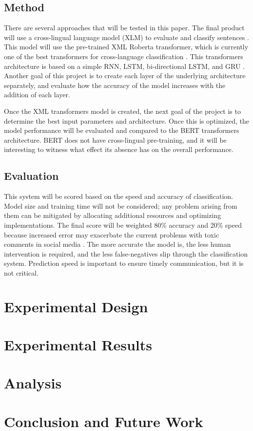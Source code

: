 \documentclass{article}
\begin{document}
\subsection{Method}

There are several approaches that will be tested in this paper. The final product will use a cross-lingual language model (XLM) to evaluate and classify sentences \cite{lample2019crosslingual}. This model will use the pre-trained XML Roberta transformer, which is currently one of the best transformers for cross-language classification \cite{deep_learning_approaches}. This transformers architecture is based on a simple RNN, LSTM, bi-directional LSTM, and GRU \cite{lample2019crosslingual}. Another goal of this project is to create each layer of the underlying architecture separately, and evaluate how the accuracy of the model increases with the addition of each layer.

Once the XML transformers model is created, the next goal of the project is to determine the best input parameters and architecture. Once this is optimized, the model performance will be evaluated and compared to the BERT transformers architecture. BERT does not have cross-lingual pre-training, and it will be interesting to witness what effect its absence has on the overall performance.

\subsection{Evaluation}

This system will be scored based on the speed and accuracy of classification. Model size and training time will not be considered; any problem arising from them can be mitigated by allocating additional resources and optimizing implementations. The final score will be weighted 80\% accuracy and 20\% speed because increased error may exacerbate the current problems with toxic comments in social media \cite{10.1145/3200947.3208069}. The more accurate the model is, the less human intervention is required, and the less false-negatives slip through the classification system. Prediction speed is important to ensure timely communication, but it is not critical.

\section{Experimental Design}

\section{Experimental Results}

\section{Analysis}

\section{Conclusion and Future Work}

\begin{footnotesize}


\end{footnotesize}%
\end{document}
